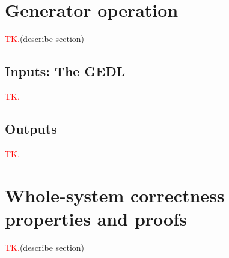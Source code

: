 \documentclass[11pt, oneside]{article}
\newcommand{\todo}{\textcolor{red}{TK.}}
\begin{document}
    \section{Generator operation} \label{generator}

        \todo (describe section)

        \subsection{Inputs: The GEDL}

            \todo

        \subsection{Outputs}

            \todo

    \section{Whole-system correctness properties and proofs}

        \todo (describe section)
\end{document}
